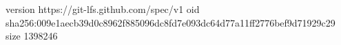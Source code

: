 version https://git-lfs.github.com/spec/v1
oid sha256:009e1aecb39d0c8962f885096dc8fd7e093dc64d77a11ff2776bef9d71929c29
size 1398246
